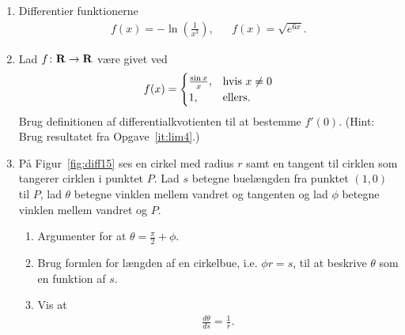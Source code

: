 \begin{enumerate}
	\item Differentier funktionerne
	\begin{align*}
	f(x)=-\ln(\frac{1}{x^3}),&& f(x)=\sqrt{e^{6x}}.
	\end{align*}
	
	\item \label{it:diff14} Lad $f\colon \mathbf{R}\to \mathbf{R}$ være givet ved
	\begin{align*}
	f(x)=\begin{cases}
	\frac{\sin x}{x},&\textup{hvis }x\neq 0\\
	1,&\textup{ellers}. 
	\end{cases}
	\end{align*}
	Brug definitionen af differentialkvotienten til at bestemme $f'(0)$. (Hint: Brug resultatet fra Opgave~\ref{it:lim4}.)
	
	\item\label{it:diff15} På Figur~\ref{fig:diff15} ses en cirkel med radius $r$ samt en tangent til cirklen som tangerer cirklen i punktet $P$. Lad $s$ betegne buelængden fra punktet $(1,0) $ til $ P $, lad $\theta$ betegne vinklen mellem vandret og tangenten og lad $\phi$ betegne vinklen mellem vandret og $P$.
	
	\begin{enumerate}
		\item Argumenter for at $\theta=\frac{\pi}{2}+\phi$.
		\item Brug formlen for længden af en cirkelbue, i.e. $ \phi r=s $, til at beskrive $ \theta $ som en funktion af $s$. 
		\item Vis at
		\begin{align*}
		\frac{d \theta}{d s}= \frac{1}{r}.
		\end{align*}
	\end{enumerate}
	
	\begin{figure}
		\centering
{}
\end{figure}
\end{enumerate}
